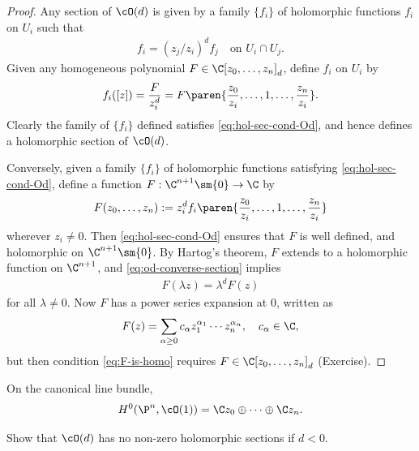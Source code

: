 \documentclass[11pt]{report}
\begin{document}
\begin{proof}
Any section of $\cO(d)$ is given by a family $\{f_i\}$ of holomorphic functions $f_i$ on $U_i$ such that
\begin{align*}
f_i=(z_j/z_i)^d f_j \quad \text{on } U_i \cap U_j. \label{eq:hol-sec-cond-Od}
\end{align*}
Given any homogeneous polynomial $F \in \C[z_0,\dots,z_n]_d$, define $f_i$ on $U_i$ by \begin{align*}
f_i([z]) = \frac{F}{z_i^d}=F \paren{\frac{z_0}{z_i},\dots,1,\dots,\frac{z_n}{z_i}}.
\end{align*}
Clearly the family of $\{f_i\}$ defined satisfies \eqref{eq:hol-sec-cond-Od}, and hence defines a holomorphic section of $\cO(d)$.

Conversely, given a family $\{f_i\}$ of holomorphic functions satisfying \eqref{eq:hol-sec-cond-Od}, define a function $F:\C^{n+1}\sm \{0\} \to \C$ by
\begin{align*} \label{eq:od-converse-section}
F(z_0,\dots,z_n) := z_i^d f_i\paren{\frac{z_0}{z_i},\dots,1,\dots,\frac{z_n}{z_i}}
\end{align*}
wherever $z_i \ne 0$. Then \eqref{eq:hol-sec-cond-Od} ensures that $F$ is well defined, and holomorphic on $\C^{n+1}\sm \{0\}$. By Hartog's theorem, $F$ extends to a holomorphic function on $\C^{n+1}$, and \eqref{eq:od-converse-section} implies
\begin{align*}
F(\lambda z) = \lambda^d F(z) \label{eq:F-is-homo}
\end{align*}
for all $\lambda \ne 0$. Now $F$ has a power series expansion at $0$, written as
\begin{align*}
F(z)=\sum_{\alpha \ge 0}c_\alpha z_1^{\alpha_1}\cdots z_n^{\alpha_n}, \quad c_\alpha \in \C,
\end{align*}
but then condition \eqref{eq:F-is-homo} requires $F \in \C[z_0,\dots,z_n]_d$ (Exercise).
\end{proof} 

\begin{cor}
On the canonical line bundle,
\begin{align*}
H^0(\P^n,\cO(1)) = \C z_0 \oplus \cdots \oplus \C z_n.
\end{align*}
\end{cor}

\begin{exercise}[]
Show that $\cO(d)$ has no non-zero holomorphic sections if $d<0$.
\end{exercise}
\end{document}
